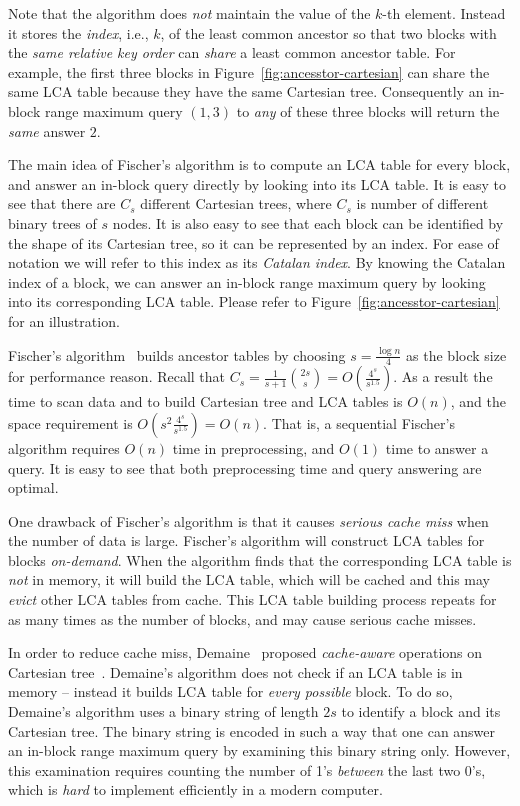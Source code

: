 Note that the algorithm does {\em not} maintain the value of the $k$-th
element.  Instead it stores the {\em index}, i.e., $k$, of the least
common ancestor so that two blocks with the {\em same relative key
order} can {\em share} a least common ancestor table.  For example, the
first three blocks in Figure~\ref{fig:ancesstor-cartesian} can share the
same LCA table because they have the same Cartesian tree. Consequently
an in-block range maximum query $(1, 3)$ to {\em any} of these three
blocks will return the {\em same} answer $2$.

The main idea of Fischer's algorithm is to compute an LCA table for
every block, and answer an in-block query directly by looking into its
LCA table.  It is easy to see that there are $C_s$ different Cartesian
trees, where $C_s$ is number of different binary trees of $s$ nodes. It
is also easy to see that each block can be identified by the shape of
its Cartesian tree, so it can be represented by an index.  For ease of
notation we will refer to this index as its {\em Catalan index}. By
knowing the Catalan index of a block, we can answer an in-block range
maximum query by looking into its corresponding LCA table. Please refer
to Figure~\ref{fig:ancesstor-cartesian} for an illustration.

Fischer's algorithm~\cite{Fischer2006TheoreticalAP} builds ancestor
tables by choosing $s = \frac{\log n}{4}$ as the block size for
performance reason.  Recall that $C_s = \frac{1}{s+1}\binom{2s}{s} =
O(\frac{4^s}{s^{1.5}})$.  As a result the time to scan data and to
build Cartesian tree and LCA tables is $O(n)$, and the space
requirement is $O(s^2 \frac{4^s}{s^{1.5}}) = O(n)$.  That is, a
sequential Fischer's algorithm requires $O(n)$ time in preprocessing,
and $O(1)$ time to answer a query.  It is easy to see that both
preprocessing time and query answering are optimal.

One drawback of Fischer's algorithm is that it causes {\em serious
  cache miss} when the number of data is large.  Fischer's algorithm
will construct LCA tables for blocks {\em on-demand}.  When the
algorithm finds that the corresponding LCA table is {\em not} in
memory, it will build the LCA table, which will be cached and this may
{\em evict} other LCA tables from cache.  This LCA table building
process repeats for as many times as the number of blocks, and may
cause serious cache misses.

In order to reduce cache miss, Demaine~\cite{Demaine2009OnCT} proposed
{\em cache-aware} operations on Cartesian
tree~\cite{Vuillemin1980AUL}.  Demaine's algorithm does not check if
an LCA table is in memory -- instead it builds LCA table for {\em
  every possible} block.  To do so, Demaine's algorithm uses a binary
string of length $2s$ to identify a block and its Cartesian tree.  The
binary string is encoded in such a way that one can answer an in-block
range maximum query by examining this binary string only.  However,
this examination requires counting the number of 1's {\em between} the
last two 0's, which is {\em hard} to implement efficiently in a modern
computer.

